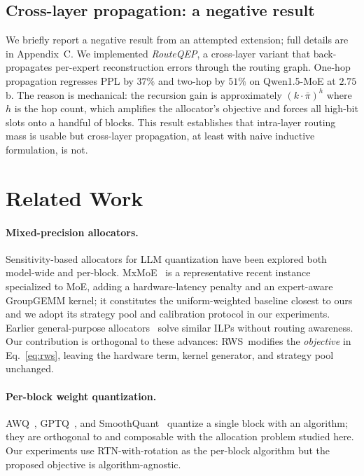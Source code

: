 \documentclass{article}
\newcommand{\method}{\textsc{RWS}\xspace}
\begin{document}
\subsection{Cross-layer propagation: a negative result}
\label{sec:routeqep-fail}

We briefly report a negative result from an attempted extension; full details are in Appendix~C. We implemented \emph{RouteQEP}, a cross-layer variant that back-propagates per-expert reconstruction errors through the routing graph. One-hop propagation regresses PPL by $37\%$ and two-hop by $51\%$ on Qwen1.5-MoE at $2.75$\,b. The reason is mechanical: the recursion gain is approximately $(k \cdot \bar\pi)^h$ where $h$ is the hop count, which amplifies the allocator's objective and forces all high-bit slots onto a handful of blocks. This result establishes that intra-layer routing mass is usable but cross-layer propagation, at least with naive inductive formulation, is not.

\section{Related Work}
\label{sec:related}

\paragraph{Mixed-precision allocators.} Sensitivity-based allocators for LLM quantization have been explored both model-wide and per-block. MxMoE~\citep{wang2025mxmoe} is a representative recent instance specialized to MoE, adding a hardware-latency penalty and an expert-aware GroupGEMM kernel; it constitutes the uniform-weighted baseline closest to ours and we adopt its strategy pool and calibration protocol in our experiments. Earlier general-purpose allocators~\citep{zhang2024optimizing, xi2024mixed} solve similar ILPs without routing awareness. Our contribution is orthogonal to these advances: \method\ modifies the \emph{objective} in Eq.~\ref{eq:rws}, leaving the hardware term, kernel generator, and strategy pool unchanged.

\paragraph{Per-block weight quantization.} AWQ~\citep{lin2023awq}, GPTQ~\citep{frantar2023gptq}, and SmoothQuant~\citep{xiao2023smoothquant} quantize a single block with an algorithm; they are orthogonal to and composable with the allocation problem studied here. Our experiments use RTN-with-rotation as the per-block algorithm but the proposed objective is algorithm-agnostic.
\end{document}
